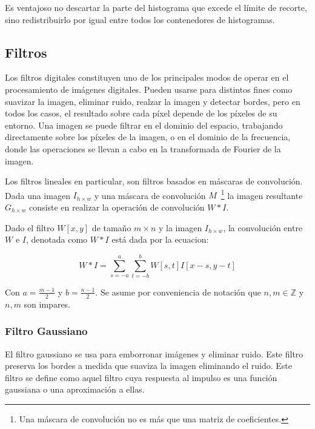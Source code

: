 Es ventajoso no descartar la parte del histograma que excede el límite de recorte, sino redistribuirlo por igual entre todos los contenedores de histogramas.


\subsection{Filtros}

Los filtros digitales constituyen uno de los principales modos de operar en el procesamiento de imágenes digitales. Pueden usarse para distintos fines como suavizar la imagen, eliminar ruido, realzar la imagen y detectar bordes, pero en todos los casos, el resultado sobre cada píxel depende de los píxeles de su entorno. Una imagen se puede filtrar en el dominio del espacio, trabajando directamente sobre los píxeles de la imagen, o en el dominio de la frecuencia, donde las operaciones se llevan a cabo en la transformada de Fourier de la imagen.

Los filtros lineales en particular, son filtros basados en máscaras de convolución. Dada una imagen $I_{h \times w}$ y una máscara de convolución $M$~\footnote{Una máscara de convolución no es más que una matriz de coeficientes.} la imagen resultante $G_{h \times w}$ consiste en realizar la operación de convolución $W * I$.

\begin{definition}
	Dado el filtro $W[x, y]$ de tamaño $m \times n$ y la imagen $I_{h \times w}$, la convolución entre $W$ e $I$, denotada como $W * I$ está dada por la ecuacion:
	
	\begin{equation}
		W * I = \sum_{s = -a}^a\sum_{t = -b}^b W[s,t] I[x - s, y - t]
	\end{equation}

	Con $a = \frac{m -1}{2}$ y $b = \frac{n -1}{2}$. Se asume por conveniencia de notación que $n, m \in \mathbb{Z}$ y $n, m$ son impares.
\end{definition}



\subsubsection{Filtro Gaussiano}

El filtro gaussiano se usa para emborronar imágenes y eliminar ruido. Este filtro preserva los bordes a medida que suaviza la imagen eliminando el ruido. Este filtro se define como aquel filtro cuya respuesta al impulso es una función gaussiana o una aproximación a ellas.


